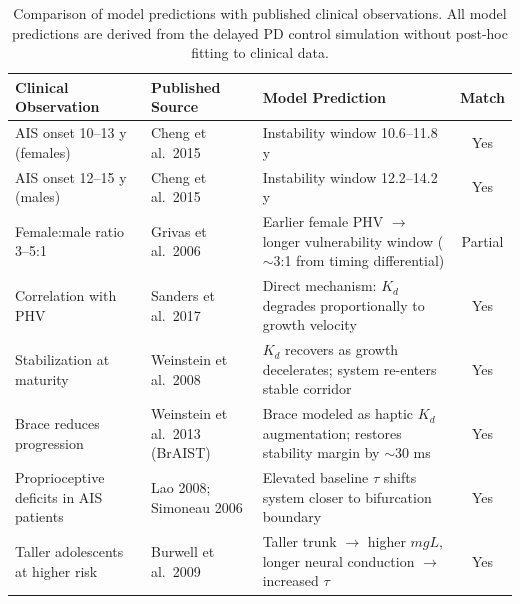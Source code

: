 \begin{table}[htbp]
\centering
\caption{Comparison of model predictions with published clinical observations. All model predictions are derived from the delayed PD control simulation without post-hoc fitting to clinical data.}
\label{tab:validation}
\begin{tabular}{p{4.2cm} p{3.2cm} p{4.2cm} c}
\toprule
Clinical Observation & Published Source & Model Prediction & Match \\
\midrule
AIS onset 10--13 y (females) & Cheng et al.\ 2015 & Instability window 10.6--11.8 y & Yes \\
AIS onset 12--15 y (males) & Cheng et al.\ 2015 & Instability window 12.2--14.2 y & Yes \\
Female:male ratio 3--5:1 & Grivas et al.\ 2006 & Earlier female PHV $\rightarrow$ longer vulnerability window ($\sim$3:1 from timing differential) & Partial \\
Correlation with PHV & Sanders et al.\ 2017 & Direct mechanism: $K_d$ degrades proportionally to growth velocity & Yes \\
Stabilization at maturity & Weinstein et al.\ 2008 & $K_d$ recovers as growth decelerates; system re-enters stable corridor & Yes \\
Brace reduces progression & Weinstein et al.\ 2013 (BrAIST) & Brace modeled as haptic $K_d$ augmentation; restores stability margin by $\sim$30 ms & Yes \\
Proprioceptive deficits in AIS patients & Lao 2008; Simoneau 2006 & Elevated baseline $\tau$ shifts system closer to bifurcation boundary & Yes \\
Taller adolescents at higher risk & Burwell et al.\ 2009 & Taller trunk $\rightarrow$ higher $mgL$, longer neural conduction $\rightarrow$ increased $\tau$ & Yes \\
\bottomrule
\end{tabular}
\end{table}
